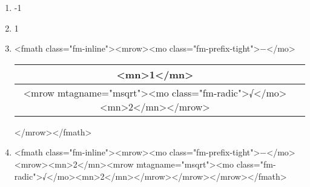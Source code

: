 \documentclass{article}
\begin{document}
\begin{enumerate}[label=(\alph*)]
\item  -1
\item  1
\item  <fmath class="fm-inline"><mrow><mo class="fm-prefix-tight">−</mo>\begin{tabular}{|c|c|}
\hline
<mn>1</mn> \\
\hline
<mrow mtagname="msqrt"><mo class="fm-radic">√</mo><mn>2</mn></mrow> \\
\hline
\end{tabular}
</mrow></fmath>
\item  <fmath class="fm-inline"><mrow><mo class="fm-prefix-tight">−</mo><mrow><mn>2</mn><mrow mtagname="msqrt"><mo class="fm-radic">√</mo><mn>2</mn></mrow></mrow></mrow></fmath>
\end{enumerate}
\newpage
\end{document}
